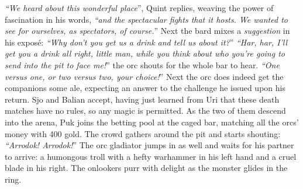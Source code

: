 {\itshape``We heard about this wonderful place}'', Quint replies, weaving the power of fascination in his words, {\itshape``and the spectacular fights that it hosts. We wanted to see for ourselves, as spectators, of course.}'' Next the bard mixes a {\itshape suggestion} in his expos\'e: {\itshape``Why don't you get us a drink and tell us about it?}'' {\itshape``Har, har, I'll get you a drink all right, little man, while you think about who you're going to send into the pit to face me!}'' the orc shouts for the whole bar to hear. {\itshape``One versus one, or two versus two, your choice!}'' Next the orc does indeed get the companions some ale, expecting an answer to the challenge he issued upon his return. Sjo and Balian accept, having just learned from Uri that these death matches have no rules, so any magic is permitted. As the two of them descend into the arena, Puk joins the betting pool at the caged bar, matching all the orcs' money with 400 gold. The crowd gathers around the pit and starts shouting: {\itshape``Arrodok! Arrodok!}'' The orc gladiator jumps in as well and waits for his partner to arrive: a humongous troll with a hefty warhammer in his left hand and a cruel blade in his right. The onlookers purr with delight as the monster glides in the ring.\\

